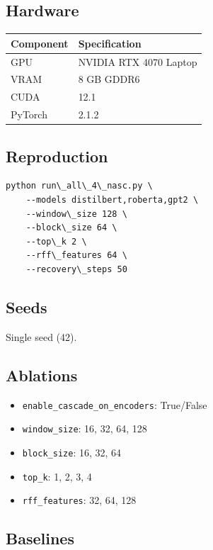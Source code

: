 \subsection{Hardware}

\begin{table}[H]
\centering
\small
\begin{tabular}{ll}
\toprule
\textbf{Component} & \textbf{Specification} \\
\midrule
GPU & NVIDIA RTX 4070 Laptop \\
VRAM & 8 GB GDDR6 \\
CUDA & 12.1 \\
PyTorch & 2.1.2 \\
\bottomrule
\end{tabular}
\end{table}

\subsection{Reproduction}

\begin{lstlisting}
python run\_all\_4\_nasc.py \
    --models distilbert,roberta,gpt2 \
    --window\_size 128 \
    --block\_size 64 \
    --top\_k 2 \
    --rff\_features 64 \
    --recovery\_steps 50
\end{lstlisting}

\subsection{Seeds}

Single seed (42).

\subsection{Ablations}

\begin{itemize}
\item \texttt{enable\_cascade\_on\_encoders}: True/False
\item \texttt{window\_size}: 16, 32, 64, 128
\item \texttt{block\_size}: 16, 32, 64
\item \texttt{top\_k}: 1, 2, 3, 4
\item \texttt{rff\_features}: 32, 64, 128

\end{itemize}
\subsection{Baselines}


